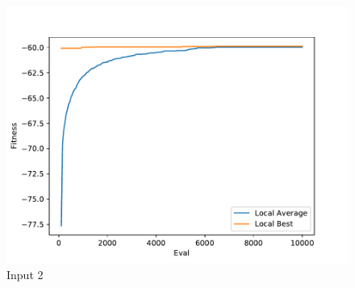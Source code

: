 \documentclass{standalone}
\begin{document}
\begin{figure}[!htb]
	\caption{Input 2}
	\label{fig:graph_2001}
	\includegraphics[width=\textwidth]{../graphs/graphs/2001.pdf}
\end{figure}
\end{document}
